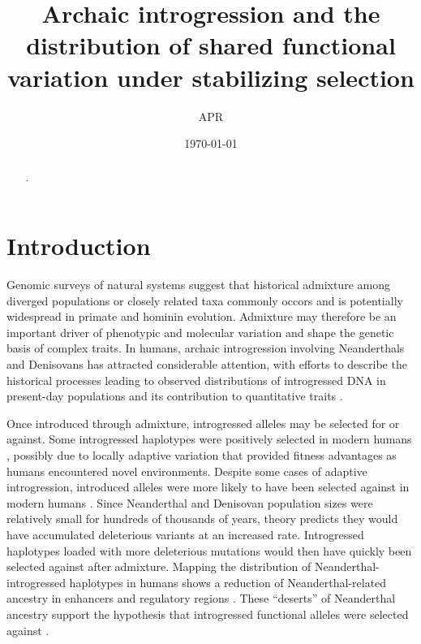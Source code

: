 \documentclass{article}
\title{Archaic introgression and the distribution
of shared functional variation under stabilizing selection}
\author{APR}
\date{\today}
\begin{document}
\maketitle    


\begin{abstract}
    .
\end{abstract}

\onehalfspacing

\section*{Introduction}

Genomic surveys of natural systems suggest that historical admixture among
diverged populations or closely related taxa commonly occors
\citep{brandvain2014speciation,skoglund2015ancient,suvorov2022widespread} and
is potentially widespread in primate
\citep{tung2017contribution,sorensen2023genome} and hominin
\citep{wolf2018outstanding,peter2020100} evolution. Admixture may therefore be
an important driver of phenotypic and molecular variation and shape the genetic
basis of complex traits. In humans, archaic introgression involving
Neanderthals and Denisovans has attracted considerable attention, with efforts
to describe the historical processes leading to observed distributions of
introgressed DNA in present-day populations
\citep{prufer2014complete,villanea2019multiple,chen2020identifying} and its
contribution to quantitative traits
\citep{sankararaman2016combined,wei2023lingering}.

Once introduced through admixture, introgressed alleles may be selected for or
against. Some introgressed haplotypes were positively selected in modern humans
\citep{huerta2014altitude,racimo2017signatures,enard2018evidence,gower2021detecting},
possibly due to locally adaptive variation that provided fitness advantages as
humans encountered novel environments. Despite some cases of adaptive
introgression, introduced alleles were more likely to have been selected
against in modern humans \citep{harris2016genetic,juric2016strength}. Since
Neanderthal and Denisovan population sizes were relatively small for hundreds
of thousands of years, theory predicts they would have accumulated deleterious
variants at an increased rate. Introgressed haplotypes loaded with more
deleterious mutations would then have quickly been selected against after
admixture. Mapping the distribution of Neanderthal-introgressed haplotypes in
humans shows a reduction of Neanderthal-related ancestry in enhancers and
regulatory regions
\citep{petr2019limits,telis2020selection,yermakovich2023long}. These
``deserts'' of Neanderthal ancestry support the hypothesis that introgressed
functional alleles were selected against
\citep{sankararaman2014genomic,sankararaman2016combined}.
\end{document}

